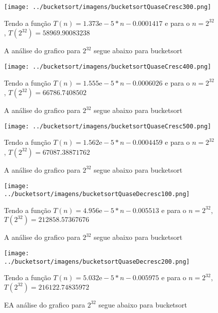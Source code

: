 \documentclass[12pt,a4paper,twoside]{report}
\begin{document}
\clearpage


\begin{figure}[ht]
\centering \texttt{[image: ../bucketsort/imagens/bucketsortQuaseCresc300.png]}
\caption{A análise do grafico para $2^{32}$ segue abaixo para bucketsort}

Tendo a função $T(n) = 1.373\mathrm{e}-5*n-0.0001417$ e para o $n =2^{32}$, $T(2^{32}) = 58969.90083238$ 
\label{fig:bucketsortQuaseCresc300}
\end{figure}




\begin{figure}[ht]
\centering \texttt{[image: ../bucketsort/imagens/bucketsortQuaseCresc400.png]}
\caption{A análise do grafico para $2^{32}$ segue abaixo para bucketsort}

Tendo a função $T(n) = 1.555\mathrm{e}-5*n-0.0006026$ e para o $n =2^{32}$, $T(2^{32}) = 66786.7408502$ 
\label{fig:bucketsortQuaseCresc400}
\end{figure}



\begin{figure}[ht]
\centering \texttt{[image: ../bucketsort/imagens/bucketsortQuaseCresc500.png]}
\caption{A análise do grafico para $2^{32}$ segue abaixo para bucketsort}

Tendo a função $T(n) = 1.562\mathrm{e}-5*n-0.0004459$ e para o $n =2^{32}$, $T(2^{32}) =  67087.38871762$ 
\label{fig:bucketsortQuaseCresc500}
\end{figure}



\begin{figure}[ht]
\centering \texttt{[image: ../bucketsort/imagens/bucketsortQuaseDecresc100.png]}
\caption{A análise do grafico para $2^{32}$ segue abaixo para bucketsort}

Tendo a função $T(n) = 4.956\mathrm{e}-5*n-0.005513$ e para o $n =2^{32}$, $T(2^{32}) = 212858.57367676 $ 
\label{fig:bucketsortQuaseDecresc100}
\end{figure}




\begin{figure}[ht]
\centering \texttt{[image: ../bucketsort/imagens/bucketsortQuaseDecresc200.png]}
\caption{EA análise do grafico para $2^{32}$ segue abaixo para bucketsort}

Tendo a função $T(n) = 5.032\mathrm{e}-5*n-0.005975$ e para o $n =2^{32}$, $T(2^{32}) = 216122.74835972$ 
\label{fig:bucketsortQuaseDecresc200}
\end{figure}
\end{document}
